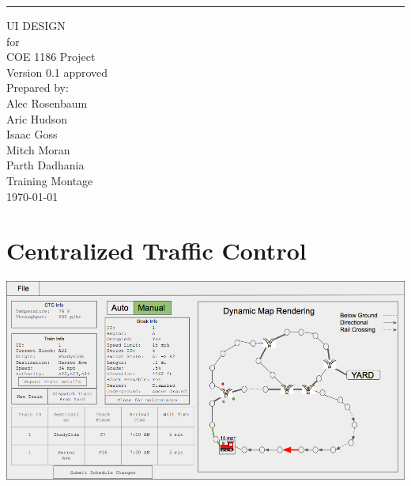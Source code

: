 \documentclass{scrreprt}
\date{}
\def\myversion{0.1 }
\begin{document}
\begin{flushright}
    \rule{16cm}{5pt}\vskip1cm
    \begin{bfseries}
        \Huge{UI DESIGN}\\
        \vspace{.9cm}
        for\\
        \vspace{.9cm}
        COE 1186 Project\\
        \vspace{.9cm}
        \LARGE{Version \myversion approved}\\
        \vspace{.9cm}
        Prepared by:\\
        Alec Rosenbaum\\
        Aric Hudson\\
        Isaac Goss\\
        Mitch Moran\\
        Parth Dadhania\\
        \vspace{1.9cm}
        Training Montage\\
        \vspace{.9cm}
        \today\\
    \end{bfseries}
\end{flushright}

\tableofcontents


\chapter{Centralized Traffic Control}

\includegraphics[width=\textwidth]{CTC-main}
\end{document}
